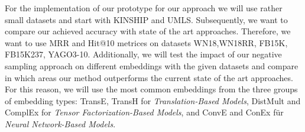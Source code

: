 
 

For the implementation of our prototype for our approach we will use rather small datasets and start with  KINSHIP and UMLS.
Subsequently, we want to compare our achieved accuracy with state of the art approaches.
Therefore, we want to use \ac{MRR} and Hit@10 metrices on datasets WN18,WN18RR, FB15K, FB15K237, YAGO3-10.
Additionally, we will test the impact of our negative sampling approach on different embeddings with the given datasets and compare in which areas our method outperforms the current state of the art approaches.
For this reason, we will use the most common embeddings from the three groups of embedding types:
TransE, TransH for \textit{Translation-Based Models}, DistMult and ComplEx for \textit{Tensor Factorization-Based Models}, and ConvE and ConEx für \textit{Neural Network-Based Models}.



